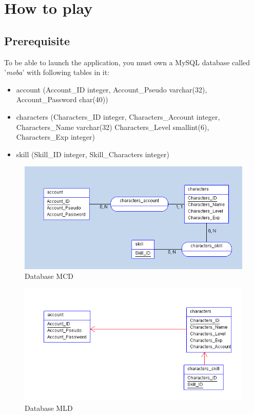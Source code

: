 \documentclass{scrreprt}
\begin{document}
		  \part{How to play}
		  \chapter{Prerequisite}
		  To be able to launch the application, you must own a MySQL database called '\emph{moba}' with following tables in it:
		  \begin{itemize}
		  \item{account (Account\_ID integer, Account\_Pseudo varchar(32), Account\_Password char(40))}
		  \item{characters (Characters\_ID integer, Characters\_Account integer, Characters\_Name varchar(32) Characters\_Level smallint(6), Characters\_Exp integer)}
		  \item{skill (Skill\_ID integer, Skill\_Characters integer)}
		  \end{itemize}
		  \begin{figure}[h]		
		  \begin{center}
		  \includegraphics[scale=0.5]{mcd.png}
		  \end{center}
		  \caption{Database MCD}
		  \end{figure}

		  \begin{figure}[h]		
		  \begin{center}
		  \includegraphics[scale=0.5]{mld.jpg}
		  \end{center}
		  \caption{Database MLD}
		  \end{figure}
\end{document}
